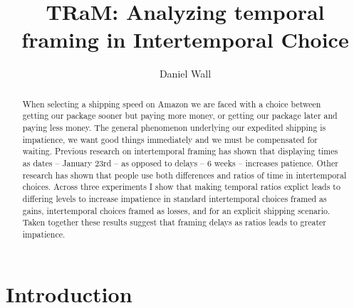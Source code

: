 \documentclass[]{article}
\title{TRaM: Analyzing temporal framing in Intertemporal Choice}
\author{Daniel Wall}
\begin{document}
\maketitle

\begin{abstract}
	When selecting a shipping speed on Amazon we are faced with a choice between getting our package sooner but paying more money, or getting our package later and paying less money. 
	The general phenomenon underlying our expedited shipping is impatience, we want good things immediately and we must be compensated for waiting. 
	Previous research on intertemporal framing has shown that displaying times as dates -- January 23rd -- as opposed to delays -- 6 weeks -- increases patience. 
	Other research has shown that people use both differences and ratios of time in intertemporal choices. 
	Across three experiments I show that making temporal ratios explict leads to differing levels to increase impatience in standard  intertemporal choices framed as gains, intertemporal choices framed as losses, and for an explicit shipping scenario. 
	Taken together these results suggest that framing delays as ratios leads to greater impatience.
	 
%
	
\end{abstract}

\section{Introduction}
\end{document}
